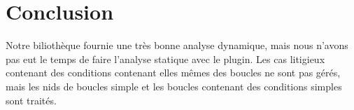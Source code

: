 \documentclass[12pt,french]{article}
\begin{document}
\section{\color{blue}Conclusion}

Notre biliothèque fournie une très bonne analyse dynamique, mais nous n'avons pas eut le temps de faire l'analyse statique avec le plugin. Les cas litigieux contenant des conditions contenant elles mêmes des boucles ne sont pas gérés, mais les nids de boucles simple et les boucles contenant des conditions simples sont traités.
\end{document}
